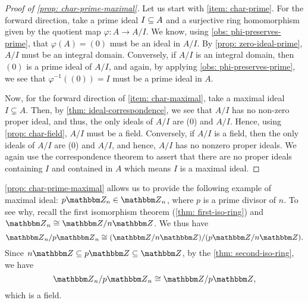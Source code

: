 \begin{proof}[Proof of \cref{prop: char-prime-maximal}]
    Let us start with \eqref{item: char-prime}. For the forward direction, take a prime ideal $I \ss A$ and a surjective ring homomorphism given by the quotient map $\varphi: A \to A/I$. We know, using \cref{obs: phi-preserves-prime}, that $\varphi(A) = (0)$ must be an ideal in $A/I$. By \cref{prop: zero-ideal-prime}, $A/I$ must be an integral domain. Conversely, if $A/I$ is an integral domain, then $(0)$ is a prime ideal of $A/I$, and again, by applying \cref{obs: phi-preserves-prime}, we see that $\varphi^{-1}((0)) = I$ must be a prime ideal in $A$. 

    Now, for the forward direction of \eqref{item: char-maximal}, take a maximal ideal $I \subsetneq A.$ Then, by \cref{thm: ideal-correspondence}, we see that $A / I$ has no non-zero proper ideal, and thus, the only ideals of $A / I$ are (0) and $A / I$. Hence, using \cref{prop: char-field}, $A / I$ must be a field. Conversely, if $A / I$ is a field, then the only ideals of $A / I$ are (0) and $A / I$, and hence, $A / I$ has no nonzero proper ideals. We again use the correspondence theorem to assert that there are no proper ideals containing $I$ and contained in $A$ which means $I$ is a maximal ideal. 
\end{proof}

\begin{example}
    \cref{prop: char-prime-maximal} allows us to provide the following example of maximal ideal: $p\Z_n \in {\Z}_{n}$, where $p$ is a prime divisor of $n$. To see why, recall the first isomorphism theorem (\cref{thm: first-iso-ring}) and ${\Z}_{n} \cong {\Z} / n {\Z}$. We thus have
    \[{\Z}_{n} / p {\Z}_{n} \cong({\Z} / n {\Z}) /(p {\Z} / n {\Z}).\]
    Since $n\Z \ss p\Z \ss \Z$, by the \cref{thm: second-iso-ring}, we have
    \[{\Z}_{n} / p {\Z}_{n} \cong {\Z} / p {\Z},\] which is a field.
\end{example}

